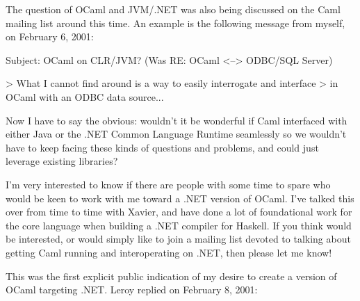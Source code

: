\documentclass[acmsmall,review]{acmart}\settopmatter{printfolios=true,printccs=false,printacmref=false}
\begin{document}
The question of OCaml and JVM/.NET was also being discussed on the Caml mailing list around this time.  An example is the following message from myself, on February 6, 2001:
\begin{verbquote}
Subject: OCaml on CLR/JVM? (Was RE: OCaml <--> ODBC/SQL Server)

> What I cannot find around is a way to easily interrogate and interface 
> in OCaml with an ODBC data source...

Now I have to say the obvious: wouldn't it be wonderful if Caml interfaced with either Java or the .NET Common Language Runtime seamlessly so we wouldn't have to keep facing these kinds of questions and problems, and could just leverage existing libraries?   

I'm very interested to know if there are people with some time to spare who would be keen to work with me toward a .NET version of OCaml.  I've talked this over from time to time with Xavier, and have done a lot of foundational work for the core language when building a .NET compiler for Haskell.  If you think would be interested, or would simply like to join a mailing list devoted to talking about getting Caml running and interoperating on .NET, then please let me know! 
\end{verbquote}
This was the first explicit public indication of my desire to create a version of OCaml targeting .NET. Leroy replied on February 8, 2001:
\end{document}
